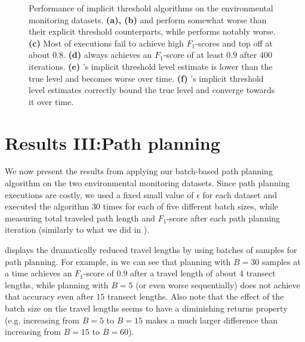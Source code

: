 \begin{figure}[tbp]
  \caption{Performance of implicit threshold algorithms on the environmental
           monitoring datasets.
           \textbf{(a), (b)} \iacl and \ibacl perform somewhat worse than their
           explicit threshold counterparts, while \istr performs notably worse.
           \textbf{(c)} Most of \istr executions fail to achieve high
           $F_1$-scores and top off at about $0.8$.
           \textbf{(d)} \iacl always achieves an $F_1$-score of at least $0.9$
           after $400$ iterations.
           \textbf{(e)} \istr's implicit threshold level estimate is lower than
           the true level and becomes worse over time.
           \textbf{(f)} \iacl's implicit threshold level estimates correctly bound
           the true level and converge towards it over time.
           }
  \label{fig:exp-imp}
\end{figure}

\section{Results III:\hspace{0.33em}Path planning}
We now present the results from applying our batch-based path planning
algorithm on the two environmental monitoring datasets. Since path planning
executions are costly, we used a fixed small value of $\epsilon$ for each
dataset and executed the algorithm $30$ times for each of five different
batch sizes, while measuring total traveled path length and $F_1$-score
after each path planning iteration (similarly to what we did in
).

 displays the dramatically reduced travel
lengths by using batches of samples for path planning.
For example, in  we can see that
planning with $B=30$ samples at a time achieves an $F_1$-score
of $0.9$ after a travel length of about $4$ transect lengths,
while planning with $B=5$ (or even worse sequentially) does
not achieve that accuracy even after $15$ transect lengths.
Also note that the effect of the batch size on the travel
lengths seems to have a diminishing returns property
(e.g. increasing from $B=5$ to $B=15$ makes a much larger
difference than increasing from $B=15$ to $B=60$).

